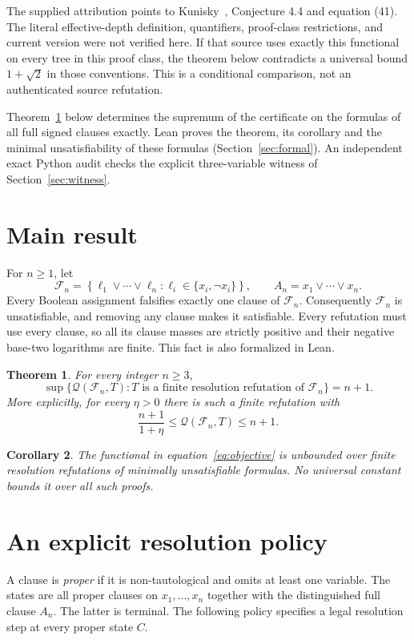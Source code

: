 \documentclass[11pt]{article}
\newtheorem{theorem}{Theorem}\newtheorem{lemma}[theorem]{Lemma}\newtheorem{corollary}[theorem]{Corollary}
\newcommand{\Q}{\mathcal Q}\newcommand{\F}{\mathcal F}
\begin{document}
The supplied attribution points to Kunisky~\cite{kunisky}, Conjecture 4.4 and equation
(41). The literal effective-depth definition, quantifiers, proof-class
restrictions, and current version were not verified here. If that source
uses exactly this functional on every tree in this proof class, the theorem
below contradicts a universal bound $1+\sqrt2$ in those conventions.
This is a conditional comparison, not an authenticated source refutation.

Theorem~\ref{thm:main} below determines the supremum of the certificate on
the formulas of all full signed clauses exactly. Lean proves the theorem,
its corollary and the minimal unsatisfiability of these formulas
(Section~\ref{sec:formal}). An independent exact Python audit checks the
explicit three-variable witness of Section~\ref{sec:witness}.

\section{Main result}
For $n\ge1$, let
\[
 \F_n=\left\{\ell_1\vee\cdots\vee\ell_n:
       \ell_i\in\{x_i,\neg x_i\}\right\},\qquad
 A_n=x_1\vee\cdots\vee x_n.
\]
Every Boolean assignment falsifies exactly one clause of $\F_n$. Consequently $\F_n$ is unsatisfiable, and removing any clause makes it satisfiable. Every refutation must use every clause, so all its clause masses are strictly positive and their negative base-two logarithms are finite. This fact is also formalized in Lean.

\begin{theorem}\label{thm:main}
For every integer $n\ge3$,
\[
 \sup\{\Q(\F_n,T):T\text{ is a finite resolution refutation of }\F_n\}=n+1.
\]
More explicitly, for every $\eta>0$ there is such a finite refutation with
\[
 \frac{n+1}{1+\eta}\le\Q(\F_n,T)\le n+1.
\]
\end{theorem}

\begin{corollary}
The functional in equation~\eqref{eq:objective} is unbounded over finite resolution refutations of minimally unsatisfiable formulas. No universal constant bounds it over all such proofs.
\end{corollary}

\section{An explicit resolution policy}
A clause is \emph{proper} if it is non-tautological and omits at least one variable. The states are all proper clauses on $x_1,\ldots,x_n$ together with the distinguished full clause $A_n$. The latter is terminal. The following policy specifies a legal resolution step at every proper state $C$.
\end{document}

